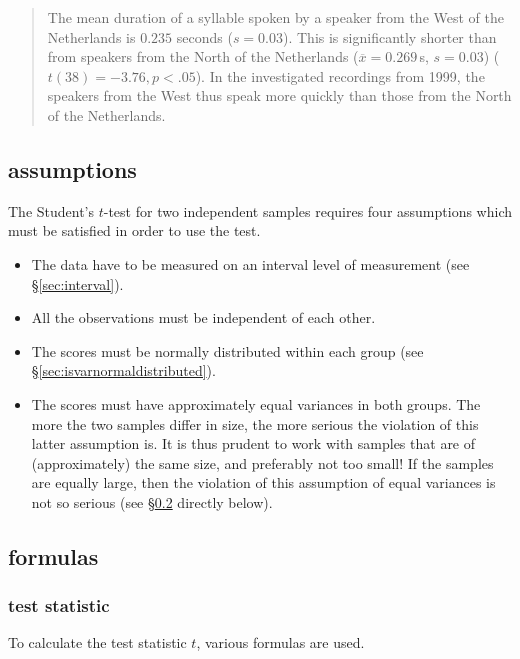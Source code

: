 \documentclass[
]{book}
\begin{document}
\begin{quote}
The mean duration of a syllable spoken by a speaker from the West
of the Netherlands is \(0.235\) seconds (\(s=0.03\)). This is
significantly shorter than from speakers from the North of the Netherlands
(\(\overline{x}=0.269\) s, \(s=0.03\)) (\(t(38)=-3.76, p<.05\)). In the
investigated recordings from 1999, the speakers from the West thus
speak more quickly than those from the North of the Netherlands.
\end{quote}

\subsection{assumptions}\label{sec:ttest-unpaired-assumptions}

The Student's \(t\)-test for two independent samples requires four assumptions
which must be satisfied in order to use the test.

\begin{itemize}
\item
  The data have to be measured on an interval level of measurement (see
  §\ref{sec:interval}).
\item
  All the observations must be independent of each other.
\item
  The scores must be normally distributed within each group (see
  §\ref{sec:isvarnormaldistributed}).
\item
  The scores must have approximately equal variances in both groups.
  The more the two samples differ in size, the more
  serious the violation of this latter assumption is. It is thus prudent
  to work with samples that are of (approximately) the same size, and preferably not too small! If the samples are equally large, then the violation of this assumption of equal
  variances is not so serious (see §\ref{sec:ttest-formulas} directly below).
\end{itemize}

\subsection{formulas}\label{sec:ttest-formulas}

\subsubsection{test statistic}\label{test-statistic}

To calculate the test statistic \(t\), various formulas are used.
\end{document}

